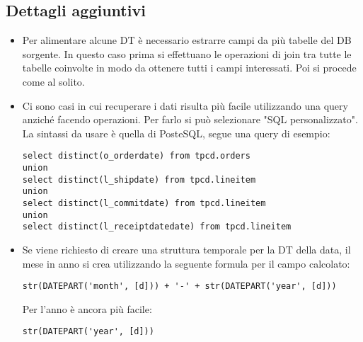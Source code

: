 \subsection{Dettagli aggiuntivi}
\begin{itemize}
	\item Per alimentare alcune DT è necessario estrarre campi da più tabelle del DB sorgente. In questo caso prima si effettuano le operazioni di join tra tutte le tabelle coinvolte in modo da ottenere tutti i campi interessati. Poi si procede come al solito.
	\item Ci sono casi in cui recuperare i dati risulta più facile utilizzando una query anziché facendo operazioni. Per farlo si può selezionare "SQL personalizzato". La sintassi da usare è quella di PosteSQL, segue una query di esempio:
	\begin{verbatim}
select distinct(o_orderdate) from tpcd.orders
union
select distinct(l_shipdate) from tpcd.lineitem
union
select distinct(l_commitdate) from tpcd.lineitem
union
select distinct(l_receiptdatedate) from tpcd.lineitem
	\end{verbatim}
	\item Se viene richiesto di creare una struttura temporale per la DT della data, il mese in anno si crea utilizzando la seguente formula per il campo calcolato:
	\begin{verbatim}
str(DATEPART('month', [d])) + '-' + str(DATEPART('year', [d]))
	\end{verbatim}
	Per l'anno è  ancora più facile:
	\begin{verbatim}
str(DATEPART('year', [d]))
	\end{verbatim}
\end{itemize}
